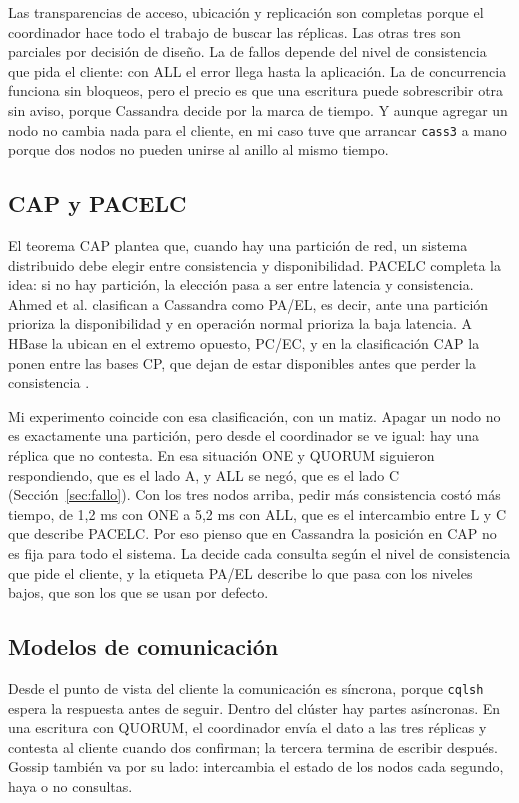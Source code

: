 \documentclass[12pt,a4paper]{article}
\begin{document}
Las transparencias de acceso, ubicación y replicación son completas porque el coordinador hace todo el trabajo de buscar las réplicas. Las otras tres son parciales por decisión de diseño. La de fallos depende del nivel de consistencia que pida el cliente: con ALL el error llega hasta la aplicación. La de concurrencia funciona sin bloqueos, pero el precio es que una escritura puede sobrescribir otra sin aviso, porque Cassandra decide por la marca de tiempo. Y aunque agregar un nodo no cambia nada para el cliente, en mi caso tuve que arrancar \texttt{cass3} a mano porque dos nodos no pueden unirse al anillo al mismo tiempo.

\subsection{CAP y PACELC}

El teorema CAP plantea que, cuando hay una partición de red, un sistema distribuido debe elegir entre consistencia y disponibilidad. PACELC completa la idea: si no hay partición, la elección pasa a ser entre latencia y consistencia. Ahmed et al. clasifican a Cassandra como PA/EL, es decir, ante una partición prioriza la disponibilidad y en operación normal prioriza la baja latencia. A HBase la ubican en el extremo opuesto, PC/EC, y en la clasificación CAP la ponen entre las bases CP, que dejan de estar disponibles antes que perder la consistencia \cite[p.~172]{ahmed2023consistency}.

Mi experimento coincide con esa clasificación, con un matiz. Apagar un nodo no es exactamente una partición, pero desde el coordinador se ve igual: hay una réplica que no contesta. En esa situación ONE y QUORUM siguieron respondiendo, que es el lado A, y ALL se negó, que es el lado C (Sección~\ref{sec:fallo}). Con los tres nodos arriba, pedir más consistencia costó más tiempo, de 1,2 ms con ONE a 5,2 ms con ALL, que es el intercambio entre L y C que describe PACELC. Por eso pienso que en Cassandra la posición en CAP no es fija para todo el sistema. La decide cada consulta según el nivel de consistencia que pide el cliente, y la etiqueta PA/EL describe lo que pasa con los niveles bajos, que son los que se usan por defecto.

\subsection{Modelos de comunicación}

Desde el punto de vista del cliente la comunicación es síncrona, porque \texttt{cqlsh} espera la respuesta antes de seguir. Dentro del clúster hay partes asíncronas. En una escritura con QUORUM, el coordinador envía el dato a las tres réplicas y contesta al cliente cuando dos confirman; la tercera termina de escribir después. Gossip también va por su lado: intercambia el estado de los nodos cada segundo, haya o no consultas.
\end{document}
